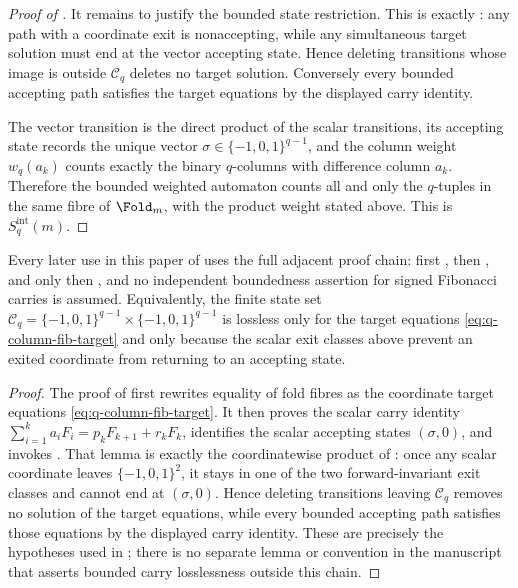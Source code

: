 \begin{proof}[Proof of ]
It remains to justify the bounded state restriction.  This is exactly
: any path with a
coordinate exit is nonaccepting, while any simultaneous target solution must end
at the vector accepting state.  Hence deleting transitions whose image is outside
\(\mathcal C_q\) deletes no target solution.  Conversely every bounded accepting
path satisfies the target equations by the displayed carry identity.

The vector transition is the direct product of the scalar transitions, its
accepting state records the unique vector
\(\sigma\in\{-1,0,1\}^{q-1}\), and the column weight \(w_q(a_k)\) counts exactly
the binary \(q\)-columns with difference column \(a_k\).  Therefore the bounded
weighted automaton counts all and only the \(q\)-tuples in the same fibre of
\(\Fold_m\), with the product weight stated above.  This is
\(S_q^{\mathrm{int}}(m)\).
\end{proof}

\begin{lemma}
\label{lem:closed-bounded-carry-proof-interface}
Every later use in this paper of  uses
the full adjacent proof chain: first
, then
, and only then
,
and no independent boundedness assertion for signed Fibonacci carries is assumed.
Equivalently, the finite state set
\(\mathcal C_q=\{-1,0,1\}^{q-1}\times\{-1,0,1\}^{q-1}\) is lossless only for
the target equations \eqref{eq:q-column-fib-target} and only because the scalar
exit classes above prevent an exited coordinate from returning to an accepting
state.
\end{lemma}

\begin{proof}
The proof of  first rewrites equality of
fold fibres as the coordinate target equations \eqref{eq:q-column-fib-target}.
It then proves the scalar carry identity
\(\sum_{i=1}^k a_iF_i=p_kF_{k+1}+r_kF_k\), identifies the scalar accepting states
\((\sigma,0)\), and invokes
.  That lemma is exactly
the coordinatewise product of
: once any scalar coordinate
leaves \(\{-1,0,1\}^2\), it stays in one of the two forward-invariant exit classes
and cannot end at \((\sigma,0)\).  Hence deleting transitions leaving
\(\mathcal C_q\) removes no solution of the target equations, while every bounded
accepting path satisfies those equations by the displayed carry identity.  These
are precisely the hypotheses used in
;
there is no separate lemma or convention in the manuscript that asserts bounded
carry losslessness outside this chain.
\end{proof}

